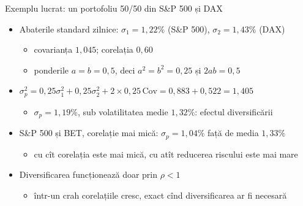 \begin{frame}{Exemplu lucrat: un portofoliu 50/50 din S\&P 500 și DAX}
\itemsize{\footnotesize}
\begin{itemize}
    \item Abaterile standard zilnice: $\sigma_1 = 1{,}22\%$ (S\&P 500), $\sigma_2 = 1{,}43\%$ (DAX)
    \begin{itemize}
        \item covarianța $1{,}045$; corelația $0{,}60$
        \item ponderile $a = b = 0{,}5$, deci $a^2 = b^2 = 0{,}25$ și $2ab = 0{,}5$
    \end{itemize}
    \item $\sigma_p^2 = 0{,}25\sigma_1^2 + 0{,}25\sigma_2^2 + 2 \times 0{,}25\,\text{Cov} = 0{,}883 + 0{,}522 = 1{,}405$
    \begin{itemize}
        \item $\sigma_p = 1{,}19\%$, sub volatilitatea medie $1{,}32\%$: efectul diversificării
    \end{itemize}
    \item S\&P 500 și BET, corelație mai mică: $\sigma_p = 1{,}04\%$ față de media $1{,}33\%$
    \begin{itemize}
        \item cu cît corelația este mai mică, cu atît reducerea riscului este mai mare
    \end{itemize}
    \item Diversificarea funcționează doar prin $\rho < 1$
    \begin{itemize}
        \item într-un crah corelațiile cresc, exact cînd diversificarea ar fi necesară
    \end{itemize}
\end{itemize}
\end{frame}

